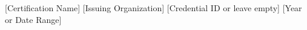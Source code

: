 

\begin{cvhonors}

%
  \cvhonor
    {[Certification Name]} %
    {[Issuing Organization]} %
    {[Credential ID or leave empty]} %
    {[Year or Date Range]} %


\end{cvhonors}
